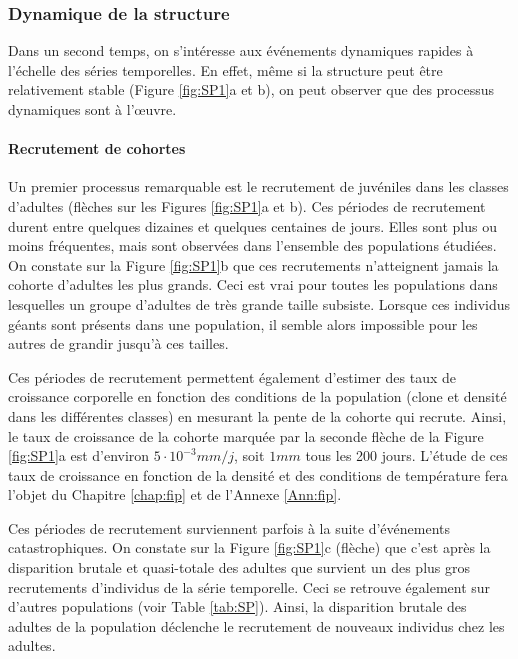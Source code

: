 \subsubsection{Dynamique de la structure}\label{sec:shortterm}

Dans un second temps, on s'intéresse aux événements dynamiques rapides
à l'échelle des séries temporelles. En effet, même si la structure peut être
relativement stable (Figure \ref{fig:SP1}a et b), on peut observer que des
processus dynamiques sont à l'\oe{}uvre.
 
\paragraph{Recrutement de cohortes}

Un premier processus remarquable est le recrutement de juvéniles dans les
classes d'adultes (flèches sur les Figures \ref{fig:SP1}a et b). Ces périodes de
recrutement  durent entre quelques dizaines et quelques centaines de jours.
Elles sont plus ou moins fréquentes, mais sont observées dans l'ensemble des
populations étudiées. On constate sur la Figure \ref{fig:SP1}b que ces recrutements
n'atteignent jamais la cohorte d'adultes les plus grands.
Ceci est vrai pour toutes les populations dans lesquelles un groupe d'adultes
de très grande taille subsiste. Lorsque ces individus géants sont présents dans
une population, il semble alors impossible pour les autres de grandir jusqu'à
ces tailles.

Ces périodes de recrutement permettent également d'estimer des taux de
croissance corporelle en fonction des conditions de la population (clone et
densité dans les différentes classes) en mesurant la pente de la cohorte qui
recrute. Ainsi, le taux de croissance de la cohorte marquée par la seconde
flèche de la Figure \ref{fig:SP1}a est d'environ $5\cdot 10^{-3}mm/j$, soit
$1mm$ tous les 200 jours. L'étude de ces taux de croissance en fonction de la
densité et des conditions de température fera l'objet du Chapitre \ref{chap:fip}
et de l'Annexe \ref{Ann:fip}.

Ces périodes de recrutement surviennent parfois à la suite d'événements
catastrophiques. On constate sur la Figure \ref{fig:SP1}c (flèche) que c'est
après la disparition brutale et quasi-totale des adultes que survient un des
plus gros recrutements d'individus de la série temporelle. Ceci se retrouve
également sur d'autres populations (voir Table \ref{tab:SP}). Ainsi, la
disparition brutale des adultes de la population déclenche le recrutement de
nouveaux individus chez les adultes. 

